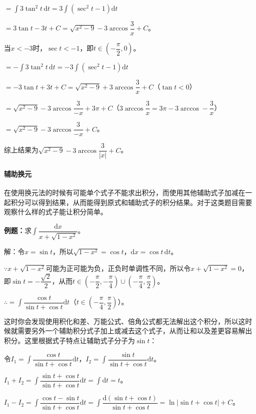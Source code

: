 \documentclass[UTF8, 12pt]{ctexart}
\begin{document}
$=\displaystyle{\int3\tan^2t\,\textrm{d}t=3\int(\sec^2t-1)\textrm{d}t}$

$=3\tan t-3t+C=\sqrt{x^2-9}-3\arccos\dfrac{3}{x}+C$。

当$x<-3$时，$\sec t<-1$，即$t\in\left(-\dfrac{\pi}{2},0\right)$。

$=\displaystyle{-\int3\tan^2t\,\textrm{d}t=-3\int(\sec^2t-1)\textrm{d}t}$

$=-3\tan t+3t+C=\sqrt{x^2-9}+3\arccos\dfrac{3}{x}+C$（$\tan t<0$）

$=\sqrt{x^2-9}-3\arccos\dfrac{3}{-x}+3\pi+C$（$3\arccos\dfrac{3}{x}=3\pi-3\arccos-\dfrac{3}{x}$）

$=\sqrt{x^2-9}-3\arccos\dfrac{3}{-x}+C$。

综上结果为$\sqrt{x^2-9}-3\arccos\dfrac{3}{\vert x\vert}+C$。

\paragraph{辅助换元} \leavevmode \medskip

在使用换元法的时候有可能单个式子不能求出积分，而使用其他辅助式子加减在一起积分可以得到结果，从而能得到原式和辅助式子的积分结果。对于这类题目需要观察什么样的式子能让积分简单。

\textbf{例题：}求$\displaystyle{\int\dfrac{\textrm{d}x}{x+\sqrt{1-x^2}}}$。\medskip

解：令$x=\sin t$，所以$\sqrt{1-x^2}=\cos t$，$\textrm{d}x=\cos t\,\textrm{d}t$。

$\because x+\sqrt{1-x^2}$可能为正可能为负，正负时单调性不同，所以令$ x+\sqrt{1-x^2}=0$，即$\sin t=-\dfrac{\sqrt{2}}{2}$，从而$t\in(-\dfrac{\pi}{2},-\dfrac{\pi}{4})\cup(-\dfrac{\pi}{4},\dfrac{\pi}{2})$。

$\therefore=\displaystyle{\int\dfrac{\cos t}{\sin t+\cos t}\textrm{d}t}$（$t\in(-\dfrac{\pi}{4},\dfrac{\pi}{2})$）。 \medskip

这时你会发现使用积化和差、万能公式、倍角公式都无法解出这个积分，所以这时候就需要另外一个辅助积分式子加上或减去这个式子，从而让和以及差更容易解出积分。这里根据式子特点让辅助式子分子为$\sin t$：

令$I_1=\displaystyle{\int\dfrac{\cos t}{\sin t+\cos t}\textrm{d}t}$，$I_2=\displaystyle{\int\dfrac{\sin t}{\sin t+\cos t}\textrm{d}t}$。

$I_1+I_2=\displaystyle{\int\dfrac{\sin t+\cos t}{\sin t+\cos t}\textrm{d}t=\int\textrm{d}t=t}$。

$I_1-I_2=\displaystyle{\int\dfrac{\cos t-\sin t}{\sin t+\cos t}\textrm{d}t=\int\dfrac{\textrm{d}(\sin t+\cos t)}{\sin t+\cos t}}=\ln\vert\sin t+\cos t\vert +C$。
\end{document}
